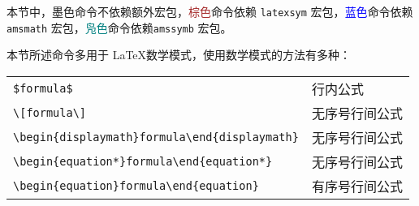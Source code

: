 本节中，墨色命令不依赖额外宏包，\textcolor{brown}{棕色}命令依赖 \verb|latexsym| 宏包，\textcolor{blue}{蓝色}命令依赖 \verb|amsmath| 宏包，\textcolor{teal}{凫色}命令依赖\verb|amssymb| 宏包。

本节所述命令多用于 \LaTeX 数学模式，使用数学模式的方法有多种：

\begin{table}[h]
	\centering
	\begin{tabular}{l l}
		\hline
		\verb|$|{\color{gray}\verb|formula|}\verb|$|                                             & 行内公式 \\
		\verb|\[|{\color{gray}\verb|formula|}\verb|\]|                                           & 无序号行间公式 \\
		\verb|\begin{displaymath}|{\color{gray}\verb|formula|}\verb|\end{displaymath}|           & 无序号行间公式 \\
		{\color{blue}\verb|\begin{equation*}|{\color{gray}\verb|formula|}\verb|\end{equation*}|} & 无序号行间公式 \\
		\verb|\begin{equation}|{\color{gray}\verb|formula|}\verb|\end{equation}|                 & 有序号行间公式 \\
		\hline
	\end{tabular}
\end{table}

\newpage
